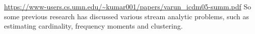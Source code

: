 



\url{https://www-users.cs.umn.edu/~kumar001/papers/varun_icdm05-summ.pdf}
So some previous research has discussed various stream analytic
problems, such as estimating cardinality, frequency moments and clustering.
